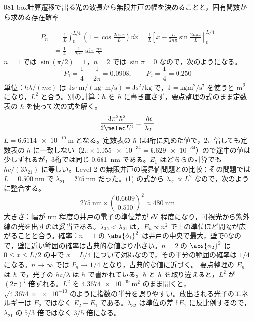 \documentclass[uplatex,dvipdfmx,a4paper,11pt]{jsarticle}
\begin{document}
\begin{mondai}{081-box}{計算}{遷移で出る光の波長から無限井戸の幅を決めることと，固有関数から求める存在確率}
\begin{tadashii}
\begin{align*}
P_{n}&=\frac{1}{L}\int_{0}^{L/4}\left(1-\cos\frac{2n\pi x}{L}\right)\dd x
=\frac{1}{L}\left[x-\frac{L}{2n\pi}\sin\frac{2n\pi x}{L}\right]_{0}^{L/4}\\
&=\frac{1}{4}-\frac{1}{2n\pi}\sin\frac{n\pi}{2}
\end{align*}
$n=1$ では $\sin(\pi/2)=1$，$n=2$ では $\sin\pi=0$ なので，次のようになる。
\[ P_{1}=\frac{1}{4}-\frac{1}{2\pi}=\num{0.0908},\qquad P_{2}=\frac{1}{4}=\num{0.250} \]
\kenzan 単位：$h\lambda/(mc)$ は $\unit{\joule\second}\cdot\unit{\metre}/(\unit{\kilogram}\cdot\unit{\metre\per\second})=\unit{\joule\second\squared\per\kilogram}$ で，$\unit{\joule}=\unit{\kilogram\metre\squared\per\second\squared}$ を使うと \unit{\metre\squared} になり，$L^{2}$ と合う。別の計算：$\hbar$ を $h$ に書き直さず，要点整理の式のまま定数表の $\hbar$ を使って次の式を解く。
\[ \frac{3\pi^{2}\hbar^{2}}{2\melec L^{2}}=\frac{hc}{\lambda_{21}} \]
$L=\qty{6.6114e-10}{\metre}$ となる。定数表の $\hbar$ は4桁に丸めた値で，$2\pi$ 倍しても定数表の $h$ に一致しない（$2\pi\times\num{1.055e-34}=\num{6.629e-34}$）ので途中の値は少しずれるが，3桁では同じ \qty{0.661}{\nano\metre} である。$E_{1}$ はどちらの計算でも $hc/(3\lambda_{21})$ に等しい。Level 2 の無限井戸の境界値問題との比較：その問題では $L=\qty{0.500}{\nano\metre}$ で $\lambda_{21}=\qty{275}{\nano\metre}$ だった。(1) の式から $\lambda_{21}\propto L^{2}$ なので，次のように整合する。
\[ \qty{275}{\nano\metre}\times\left(\frac{\num{0.6609}}{\num{0.500}}\right)^{2}\approx\qty{480}{\nano\metre} \]
大きさ：幅が \unit{\nano\metre} 程度の井戸の電子の準位差が \unit{\electronvolt} 程度になり，可視光から紫外線の光を出すのは妥当である。$\lambda_{32}<\lambda_{21}$ は，$E_{n}\propto n^{2}$ で上の準位ほど間隔が広がることと合う。確率：$n=1$ の $\abs{\phi_{1}}^{2}$ は井戸の中央で最大，壁で0なので，壁に近い範囲の確率は古典的な値より小さい。$n=2$ の $\abs{\phi_{2}}^{2}$ は $0\le x\le L/2$ の中で $x=L/4$ について対称なので，その半分の範囲の確率は $1/4$ になる。$n\to\infty$ では $P_{n}\to 1/4$ となり，古典的な値に近づく。
\tsumazuki 要点整理の $E_{n}$ は $\hbar$ で，光子の $hc/\lambda$ は $h$ で書かれている。$\hbar$ と $h$ を取り違えると，$L^{2}$ が $(2\pi)^{2}$ 倍ずれる。$L^{2}$ を $\qty{4.3674e-19}{\metre\squared}$ のまま開くと，$\sqrt{\num{4.3674}}\times\num{e-10}$ のように指数の半分を誤りやすい。放出される光子のエネルギーは $E_{2}$ ではなく $E_{2}-E_{1}$ である。$\lambda_{32}$ は準位の差 $5E_{1}$ に反比例するので，$\lambda_{21}$ の $5/3$ 倍ではなく $3/5$ 倍になる。
\end{tadashii}
\end{mondai}
\end{document}
